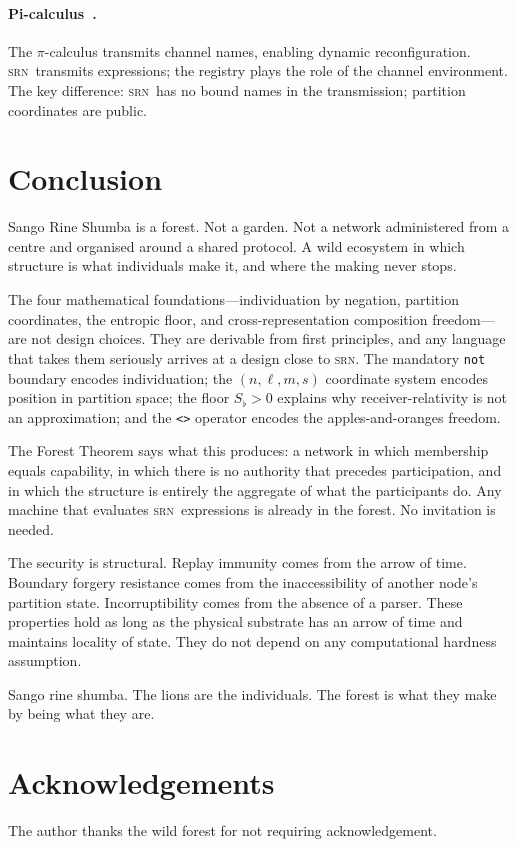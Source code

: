 \documentclass[twocolumn,11pt,a4paper]{article}
\theoremstyle{definition}
\theoremstyle{remark}
\newcommand{\srn}{\textsc{srn}}
\newcommand{\floor}{S_{\flat}}
\begin{document}
\paragraph{Pi-calculus~\cite{milner1992pi}.}
The $\pi$-calculus transmits channel names, enabling dynamic
reconfiguration.  \srn\ transmits expressions; the registry plays the
role of the channel environment.  The key difference: \srn\ has no
bound names in the transmission; partition coordinates are public.

\section{Conclusion}
\label{sec:conclusion}

Sango Rine Shumba is a forest.  Not a garden.  Not a network
administered from a centre and organised around a shared protocol.
A wild ecosystem in which structure is what individuals make it, and
where the making never stops.

The four mathematical foundations---individuation by negation,
partition coordinates, the entropic floor, and cross-representation
composition freedom---are not design choices.  They are derivable from
first principles, and any language that takes them seriously arrives
at a design close to \srn.  The mandatory \lstinline|not| boundary
encodes individuation; the $(n,\ell,m,s)$ coordinate system encodes
position in partition space; the floor $\floor > 0$ explains why
receiver-relativity is not an approximation; and the \lstinline|<>|
operator encodes the apples-and-oranges freedom.

The Forest Theorem says what this produces: a network in which
membership equals capability, in which there is no authority that
precedes participation, and in which the structure is entirely the
aggregate of what the participants do.  Any machine that evaluates
\srn\ expressions is already in the forest.  No invitation is needed.

The security is structural.  Replay immunity comes from the arrow of
time.  Boundary forgery resistance comes from the inaccessibility of
another node's partition state.  Incorruptibility comes from the
absence of a parser.  These properties hold as long as the physical
substrate has an arrow of time and maintains locality of state.  They
do not depend on any computational hardness assumption.

Sango rine shumba.  The lions are the individuals.  The forest is what
they make by being what they are.

\section*{Acknowledgements}

The author thanks the wild forest for not requiring acknowledgement.



\end{document}
